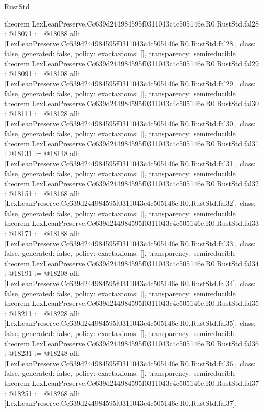 \begin{lexlean}{RustStd}
\begin{coremodule}
{}
theorem LexLeanPreserve.Cc639d244984595f0311043c4c505146e.R0.RustStd.fal28 : @18071 := @18088 {
  all: [LexLeanPreserve.Cc639d244984595f0311043c4c505146e.R0.RustStd.fal28],
  class: false,
  generated: false,
  policy: exact{axioms: []},
  transparency: semireducible
}
theorem LexLeanPreserve.Cc639d244984595f0311043c4c505146e.R0.RustStd.fal29 : @18091 := @18108 {
  all: [LexLeanPreserve.Cc639d244984595f0311043c4c505146e.R0.RustStd.fal29],
  class: false,
  generated: false,
  policy: exact{axioms: []},
  transparency: semireducible
}
theorem LexLeanPreserve.Cc639d244984595f0311043c4c505146e.R0.RustStd.fal30 : @18111 := @18128 {
  all: [LexLeanPreserve.Cc639d244984595f0311043c4c505146e.R0.RustStd.fal30],
  class: false,
  generated: false,
  policy: exact{axioms: []},
  transparency: semireducible
}
theorem LexLeanPreserve.Cc639d244984595f0311043c4c505146e.R0.RustStd.fal31 : @18131 := @18148 {
  all: [LexLeanPreserve.Cc639d244984595f0311043c4c505146e.R0.RustStd.fal31],
  class: false,
  generated: false,
  policy: exact{axioms: []},
  transparency: semireducible
}
theorem LexLeanPreserve.Cc639d244984595f0311043c4c505146e.R0.RustStd.fal32 : @18151 := @18168 {
  all: [LexLeanPreserve.Cc639d244984595f0311043c4c505146e.R0.RustStd.fal32],
  class: false,
  generated: false,
  policy: exact{axioms: []},
  transparency: semireducible
}
theorem LexLeanPreserve.Cc639d244984595f0311043c4c505146e.R0.RustStd.fal33 : @18171 := @18188 {
  all: [LexLeanPreserve.Cc639d244984595f0311043c4c505146e.R0.RustStd.fal33],
  class: false,
  generated: false,
  policy: exact{axioms: []},
  transparency: semireducible
}
theorem LexLeanPreserve.Cc639d244984595f0311043c4c505146e.R0.RustStd.fal34 : @18191 := @18208 {
  all: [LexLeanPreserve.Cc639d244984595f0311043c4c505146e.R0.RustStd.fal34],
  class: false,
  generated: false,
  policy: exact{axioms: []},
  transparency: semireducible
}
theorem LexLeanPreserve.Cc639d244984595f0311043c4c505146e.R0.RustStd.fal35 : @18211 := @18228 {
  all: [LexLeanPreserve.Cc639d244984595f0311043c4c505146e.R0.RustStd.fal35],
  class: false,
  generated: false,
  policy: exact{axioms: []},
  transparency: semireducible
}
theorem LexLeanPreserve.Cc639d244984595f0311043c4c505146e.R0.RustStd.fal36 : @18231 := @18248 {
  all: [LexLeanPreserve.Cc639d244984595f0311043c4c505146e.R0.RustStd.fal36],
  class: false,
  generated: false,
  policy: exact{axioms: []},
  transparency: semireducible
}
theorem LexLeanPreserve.Cc639d244984595f0311043c4c505146e.R0.RustStd.fal37 : @18251 := @18268 {
  all: [LexLeanPreserve.Cc639d244984595f0311043c4c505146e.R0.RustStd.fal37],
}
\end{coremodule}
\end{lexlean}
